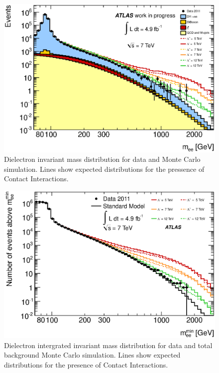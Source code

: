 	\begin{figure}[h!p]
	\centering
	\includegraphics[width=0.9\linewidth]{images/inv_mass.eps}
	\caption{Dielectron invariant mass distribution for data and Monte Carlo simulation. Lines show expected distributions for the pressence of Contact Interactions.}
	\label{fig:CIinvMass}
	\end{figure}

	\begin{figure}[h!p]
	\centering
	\includegraphics[width=0.9\linewidth]{images/int_inv_mass.eps}
	\caption{Dielectron intergrated invariant mass distribution for data and total background Monte Carlo simulation. Lines show expected distributions for the presence of Contact Interactions.}
	\label{fig:CIintinvMass}
	\end{figure}


